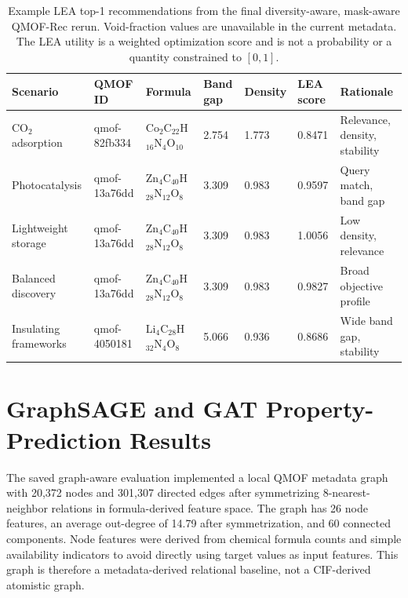 \documentclass[12pt,a4paper]{article}
\begin{document}
\begin{table}[H]
\centering
\caption{Example LEA top-1 recommendations from the final diversity-aware, mask-aware QMOF-Rec rerun. Void-fraction values are unavailable in the current metadata. The LEA utility is a weighted optimization score and is not a probability or a quantity constrained to $[0,1]$.}
\label{tab:examples}
\scriptsize
\setlength{\tabcolsep}{3pt}
\begin{tabular}{L{2.2cm} L{2.0cm} L{3.25cm} C{1.25cm} C{1.2cm} C{1.35cm} L{2.1cm}}
\toprule
\textbf{Scenario} & \textbf{QMOF ID} & \textbf{Formula} & \textbf{Band gap} & \textbf{Density} & \textbf{LEA score} & \textbf{Rationale}\\
\midrule
CO$_2$ adsorption  & qmof-82fb334 & Co$_2$C$_{22}$H$_{16}$N$_4$O$_{10}$ & 2.754 & 1.773 & 0.8471 & Relevance, density, stability\\
Photocatalysis     & qmof-13a76dd & Zn$_4$C$_{40}$H$_{28}$N$_{12}$O$_8$ & 3.309 & 0.983 & 0.9597 & Query match, band gap\\
Lightweight storage & qmof-13a76dd & Zn$_4$C$_{40}$H$_{28}$N$_{12}$O$_8$ & 3.309 & 0.983 & 1.0056 & Low density, relevance\\
Balanced discovery  & qmof-13a76dd & Zn$_4$C$_{40}$H$_{28}$N$_{12}$O$_8$ & 3.309 & 0.983 & 0.9827 & Broad objective profile\\
Insulating frameworks & qmof-4050181 & Li$_4$C$_{28}$H$_{32}$N$_4$O$_8$ & 5.066 & 0.936 & 0.8686 & Wide band gap, stability\\
\bottomrule
\end{tabular}
\end{table}

\section{GraphSAGE and GAT Property-Prediction Results}
\label{sec:gnn}

The saved graph-aware evaluation implemented a local QMOF metadata graph with 20{,}372 nodes and 301{,}307 directed edges after symmetrizing 8-nearest-neighbor relations in formula-derived feature space. The graph has 26 node features, an average out-degree of 14.79 after symmetrization, and 60 connected components. Node features were derived from chemical formula counts and simple availability indicators to avoid directly using target values as input features. This graph is therefore a metadata-derived relational baseline, not a CIF-derived atomistic graph.
\end{document}
